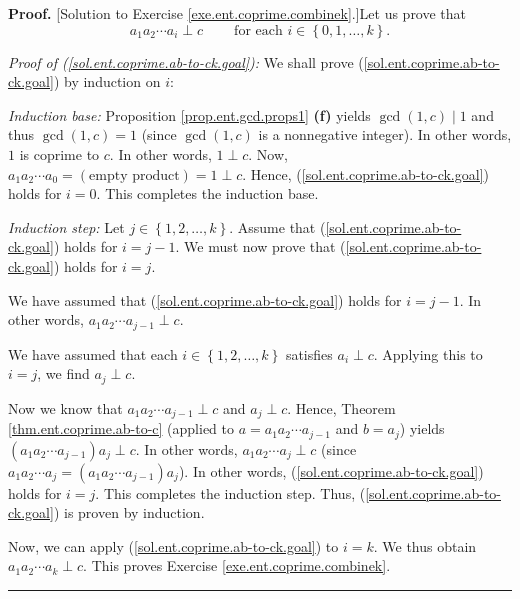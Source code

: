 \documentclass[numbers=enddot,12pt,final,onecolumn,notitlepage]{scrartcl}%
\numberwithin{exer}{subsection}
\theoremstyle{definition}
\newenvironment{fineprint}{\begin{small}}{\end{small}}
\newenvironment{proof}[1][Proof]{\noindent\textbf{#1.} }{\ \rule{0.5em}{0.5em}}
\begin{document}
\begin{fineprint}
\begin{proof}
[Solution to Exercise \ref{exe.ent.coprime.combinek}.]Let us prove that%
\begin{equation}
a_{1}a_{2}\cdots a_{i}\perp c\ \ \ \ \ \ \ \ \ \ \text{for each }i\in\left\{
0,1,\ldots,k\right\}  . \label{sol.ent.coprime.ab-to-ck.goal}%
\end{equation}


\textit{Proof of (\ref{sol.ent.coprime.ab-to-ck.goal}):} We shall prove
(\ref{sol.ent.coprime.ab-to-ck.goal}) by induction on $i$:

\textit{Induction base:} Proposition \ref{prop.ent.gcd.props1} \textbf{(f)}
yields $\gcd\left(  1,c\right)  \mid1$ and thus $\gcd\left(  1,c\right)  =1$
(since $\gcd\left(  1,c\right)  $ is a nonnegative integer). In other words,
$1$ is coprime to $c$. In other words, $1\perp c$. Now, $a_{1}a_{2}\cdots
a_{0}=\left(  \text{empty product}\right)  =1\perp c$. Hence,
(\ref{sol.ent.coprime.ab-to-ck.goal}) holds for $i=0$. This completes the
induction base.

\textit{Induction step:} Let $j\in\left\{  1,2,\ldots,k\right\}  $. Assume
that (\ref{sol.ent.coprime.ab-to-ck.goal}) holds for $i=j-1$. We must now
prove that (\ref{sol.ent.coprime.ab-to-ck.goal}) holds for $i=j$.

We have assumed that (\ref{sol.ent.coprime.ab-to-ck.goal}) holds for $i=j-1$.
In other words, $a_{1}a_{2}\cdots a_{j-1}\perp c$.

We have assumed that each $i\in\left\{  1,2,\ldots,k\right\}  $ satisfies
$a_{i}\perp c$. Applying this to $i=j$, we find $a_{j}\perp c$.

Now we know that $a_{1}a_{2}\cdots a_{j-1}\perp c$ and $a_{j}\perp c$. Hence,
Theorem \ref{thm.ent.coprime.ab-to-c} (applied to $a=a_{1}a_{2}\cdots a_{j-1}$
and $b=a_{j}$) yields $\left(  a_{1}a_{2}\cdots a_{j-1}\right)  a_{j}\perp c$.
In other words, $a_{1}a_{2}\cdots a_{j}\perp c$ (since $a_{1}a_{2}\cdots
a_{j}=\left(  a_{1}a_{2}\cdots a_{j-1}\right)  a_{j}$). In other words,
(\ref{sol.ent.coprime.ab-to-ck.goal}) holds for $i=j$. This completes the
induction step. Thus, (\ref{sol.ent.coprime.ab-to-ck.goal}) is proven by induction.

Now, we can apply (\ref{sol.ent.coprime.ab-to-ck.goal}) to $i=k$. We thus
obtain $a_{1}a_{2}\cdots a_{k}\perp c$. This proves Exercise
\ref{exe.ent.coprime.combinek}.
\end{proof}
\end{fineprint}
\end{document}
